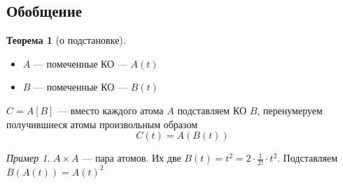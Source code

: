 \documentclass[english]{article}
\theoremstyle{plain}
\theoremstyle{remark}
\newtheorem*{examp}{Пример}
\theoremstyle{definition}
\newtheorem{theorem}{Теорема}[section]
\begin{document}
\subsection{Обобщение}
\label{sec:orge59a004}

\begin{theorem}[о подстановке]
\-
\begin{itemize}
\item \(A\) --- помеченные КО --- \(A(t)\)
\item \(B\) --- помеченные КО --- \(B(t)\)
\end{itemize}
\(C = A[B]\) --- вместо каждого атома \(A\) подставляем КО \(B\), перенумеруем получившиеся атомы произвольным образом
\[ C(t) = A(B(t)) \]
\end{theorem}
\begin{examp}
\(A\times A\) --- пара атомов. Их две \(B(t) = t^2 = 2 \cdot \frac{1}{2!} \cdot t^2\). Подставляем \(B(A(t)) = A(t)^2\)
\end{examp}
\end{document}
